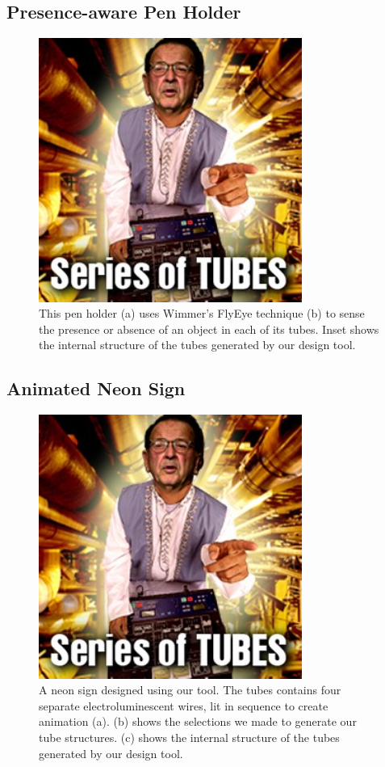 \subsection{Presence-aware Pen Holder}

\begin{figure}[h]
\centering
    \includegraphics[width=3.4in]{figures/series-of-tubes.jpg}
\caption{This pen holder (a) uses Wimmer's FlyEye technique  (b) to sense the presence or absence of an object in each of its tubes.  Inset shows the internal structure of the tubes generated by our design tool.}
\label{fig:pens}
\end{figure}

\subsection{Animated Neon Sign}

\begin{figure}[h]
\centering
    \includegraphics[width=3.4in]{figures/series-of-tubes.jpg}
\caption{A neon sign designed using our tool.  The tubes contains four separate electroluminescent wires, lit in sequence to create animation (a).  (b) shows the selections we made to generate our tube structures.  (c) shows the internal structure of the tubes generated by our design tool.}
\label{fig:neon}
\end{figure}
